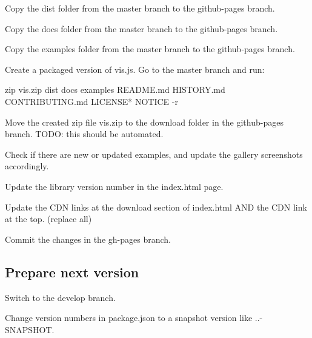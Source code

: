 \begin{DoxyItemize}
\item Copy the {\ttfamily dist} folder from the {\ttfamily master} branch to the {\ttfamily github-\/pages} branch.
\item Copy the {\ttfamily docs} folder from the {\ttfamily master} branch to the {\ttfamily github-\/pages} branch.
\item Copy the {\ttfamily examples} folder from the {\ttfamily master} branch to the {\ttfamily github-\/pages} branch.
\item Create a packaged version of vis.\+js. Go to the {\ttfamily master} branch and run\+: \begin{DoxyVerb}  zip vis.zip dist docs examples README.md HISTORY.md CONTRIBUTING.md LICENSE* NOTICE -r
\end{DoxyVerb}

\item Move the created zip file {\ttfamily vis.\+zip} to the {\ttfamily download} folder in the {\ttfamily github-\/pages} branch. T\+O\+DO\+: this should be automated.
\item Check if there are new or updated examples, and update the gallery screenshots accordingly.
\item Update the library version number in the index.\+html page.
\item Update the C\+DN links at the download section of index.\+html A\+ND the C\+DN link at the top. (replace all)
\item Commit the changes in the {\ttfamily gh-\/pages} branch.
\end{DoxyItemize}

\subsection*{Prepare next version}


\begin{DoxyItemize}
\item Switch to the {\ttfamily develop} branch.
\item Change version numbers in {\ttfamily package.\+json} to a snapshot version like {..-\/\+S\+N\+A\+P\+S\+H\+OT}. 
\end{DoxyItemize}